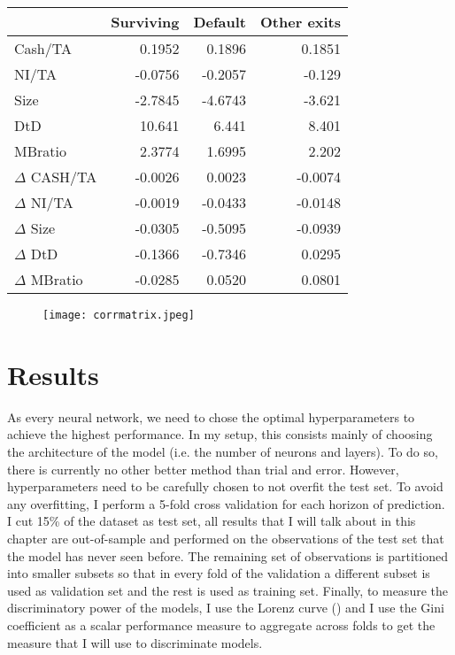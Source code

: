 \begin{table}[]
    \centering
    \begin{tabular}{lrrr}
    \hline \hline
                 & Surviving &   Default  & Other exits \\
    \hline
Cash/TA          &  0.1952 &  0.1896  &    0.1851 \\
NI/TA            & -0.0756 & -0.2057  &   -0.129 \\
Size             & -2.7845 & -4.6743  &   -3.621 \\
DtD              & 10.641 &  6.441  &    8.401 \\
MBratio          &  2.3774 &  1.6995  &    2.202 \\
$\Delta$ CASH/TA  & -0.0026 &  0.0023  &   -0.0074 \\
$\Delta$   NI/TA     & -0.0019 & -0.0433  &   -0.0148 \\
$\Delta$  Size      & -0.0305 & -0.5095  &   -0.0939 \\
$\Delta$   DtD       & -0.1366 & -0.7346  &    0.0295 \\
$\Delta$  MBratio   & -0.0285 &  0.0520  &    0.0801 \\
\hline
    \end{tabular}
    \label{tab:meanvar}
\end{table}


\begin{figure}
    \centering
    \texttt{[image: corrmatrix.jpeg]}
    \label{fig:corrmat}
\end{figure}

\section{Results}
\label{sec4}


As every neural network, we need to chose the optimal hyperparameters to achieve the highest performance. In my setup, this consists mainly of choosing the architecture of the model (i.e. the number of neurons and layers). To do so, there is currently no other better method than trial and error. However, hyperparameters need to be carefully chosen to not overfit the test set. To avoid any overfitting, I perform a 5-fold cross validation for each horizon of prediction. I cut 15\% of the dataset as test set, all results that I will talk about in this chapter are out-of-sample and performed on the observations of the test set that the model has never seen before. The remaining set of observations is partitioned into smaller subsets so that in every fold of the validation a different subset is used as validation set and the rest is used as training set. Finally, to measure the discriminatory power of the models, I use the Lorenz curve (\citet{lorenz}) and I use the Gini coefficient as a scalar performance measure to aggregate across folds to get the  measure that I will use to discriminate models. \\

